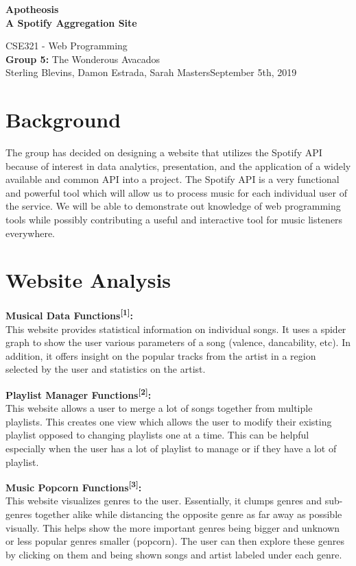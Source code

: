\documentclass[letter, 11pt]{article}
\begin{document}
\noindent
\begin{center}
\large\textbf{Apotheosis} \\
\textbf{A Spotify Aggregation Site}
\end{center}

\noindent
\normalsize CSE321 - Web Programming\\
\textbf{Group 5:} The Wonderous Avacados\\
Sterling Blevins, Damon Estrada, Sarah Masters\hfill September 5th, 2019
 
\section*{Background}
The group has decided on designing a website that utilizes the Spotify API because of interest in data analytics, presentation, and the application of a widely available and common API into a project. The Spotify API is a very functional and powerful tool which will allow us to process music for each individual user of the service. We will be able to demonstrate out knowledge of web programming tools while possibly contributing a useful and interactive tool for music listeners everywhere. 

\section*{Website Analysis}

\noindent
\textbf{Musical Data Functions{\textsuperscript{[1]}}:}\\
This website provides statistical information on individual songs. It uses a spider graph to show the user various parameters of a song (valence, dancability, etc). In addition, it offers insight on the popular tracks from the artist in a region selected by the user and statistics on the artist.
\setlength{\parskip}{7pt}

\noindent
\textbf{Playlist Manager Functions{\textsuperscript{[2]}}:}\\
This website allows a user to merge a lot of songs together from multiple playlists. This creates one view which allows the user to modify their existing playlist opposed to changing playlists one at a time. This can be helpful especially when the user has a lot of playlist to manage or if they have a lot of playlist.
\setlength{\parskip}{7pt}

\noindent
\textbf{Music Popcorn Functions{\textsuperscript{[3]}}:}\\
This website visualizes genres to the user. Essentially, it clumps genres and sub-genres together alike while distancing the opposite genre as far away as possible visually. This helps show the more important genres being bigger and unknown or less popular genres smaller (popcorn). The user can then explore these genres by clicking on them and being shown songs and artist labeled under each genre.
\setlength{\parskip}{7pt}
\end{document}
